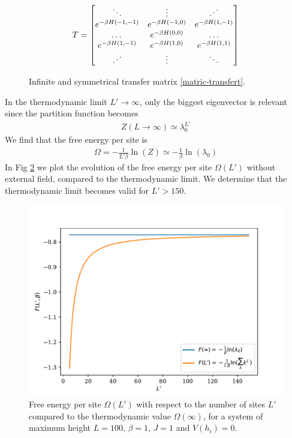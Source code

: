 \begin{figure}
\begin{align}
T = \begin{bmatrix} 
\ddots & \vdots & \reflectbox{$\ddots$} \\ 
e^{-\beta H(-1,-1)} & e^{-\beta H(-1,0)} & e^{-\beta H(1,-1)} \\
\dots & e^{-\beta H(0,0)} & \dots \\
e^{-\beta H(1,-1)} & e^{-\beta H(1,0)} & e^{-\beta H(1,1)} \\ 
\reflectbox{$\ddots$} & \vdots &\ddots \\ 
\end{bmatrix}
\end{align}
\caption{Infinite and symmetrical transfer matrix \ref{matric-transfert}.}
\label{mat-inf}
\end{figure}

In the thermodynamic limit $L' \to \infty$, only the biggest eigenvector is relevant since the partition function becomes
\begin{align}
Z(L\to \infty) \simeq \lambda_0^{L'}
\end{align}
We find that the free energy per site is 
\begin{align}
\Omega = - \frac{1}{L' \beta} \ln(Z) \simeq - \frac{1}{\beta } \ln( \lambda_0)
\label{energie-libre-site}
\end{align}
In Fig \ref{fig-thermo-libre} we plot the evolution of the free energy per site $\Omega(L')$ without external field, compared to the thermodynamic limit. We determine that the thermodynamic limit becomes valid for $L' \greater 150 $.

\begin{figure}
\centering
\includegraphics[width=0.7\linewidth]{int-dyn/freeene-thermo-libre.pdf}
\caption{Free energy per site $\Omega(L')$ with respect to the number of sites $L'$ compared to the thermodynamic value $\Omega(\infty)$, for a system of maximum height $L=100$, $\beta=1$, $J=1$ and $V(h_i)=0$.}
\label{fig-thermo-libre}
\vspace{-0.5cm}
\end{figure} 

